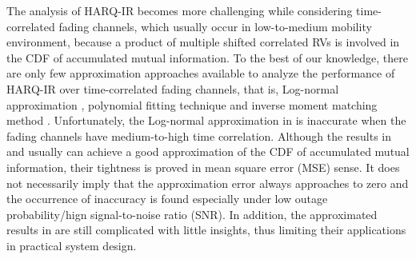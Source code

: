 \documentclass[12pt,onecolumn,draftcls]{IEEEtran}
\begin{document}

The analysis of HARQ-IR becomes more challenging while considering time-correlated fading channels, which usually occur in low-to-medium mobility environment, because a product of multiple shifted correlated RVs is involved in the CDF of accumulated mutual information. To the best of our knowledge, there are only few approximation approaches available to analyze the performance of HARQ-IR over time-correlated fading channels, that is, Log-normal approximation \cite{yang2014performance}, polynomial fitting technique \cite{shi2015analysis} and inverse moment matching method \cite{shi2016inverse}. Unfortunately, the Log-normal approximation in \cite{yang2014performance} is inaccurate when the fading channels have medium-to-high time correlation. Although the results in \cite{shi2015analysis} and \cite{shi2016inverse} usually can achieve a good approximation of the CDF of accumulated mutual information, their tightness is proved in mean square error (MSE) sense. It does not necessarily imply that the approximation error always approaches to zero and the occurrence of inaccuracy is found especially under low outage probability/hign signal-to-noise ratio (SNR). In addition, the approximated results in \cite{shi2015analysis,shi2016inverse} are still complicated with little insights, thus limiting their applications in practical system design.
\end{document}
